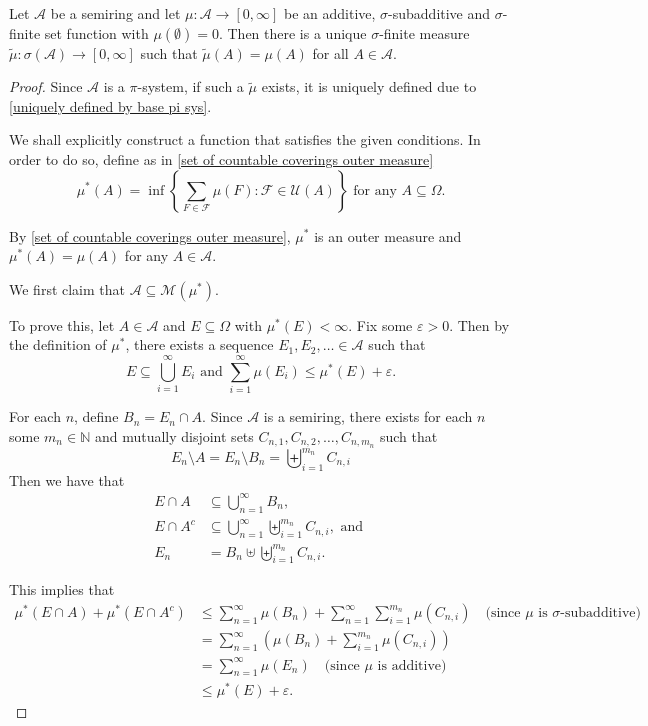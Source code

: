 \begin{theorem}
\label{MeasureExtensionTh}
    Let $\mathcal{A}$ be a semiring and let $\mu:\mathcal{A}\to[0,\infty]$ be an additive, $\sigma$-subadditive and $\sigma$-finite set function with $\mu(\emptyset)=0$. Then there is a unique $\sigma$-finite measure $\tilde\mu:\sigma(\mathcal{A})\to[0,\infty]$ such that $\tilde\mu(A)=\mu(A)$ for all $A\in\mathcal{A}$.
\end{theorem}
\begin{proof}
    Since $\mathcal{A}$ is a $\pi$-system, if such a $\tilde\mu$ exists, it is uniquely defined due to \ref{uniquely defined by base pi sys}.
    
    We shall explicitly construct a function that satisfies the given conditions. In order to do so, define as in \ref{set of countable coverings outer measure}
    $$\mu^*(A)=\inf\left\{\sum_{F\in\mathcal{F}}\mu(F) : \mathcal{F}\in\mathcal{U}(A) \right\}\text{ for any $A\subseteq\Omega$.}$$
    
    By \ref{set of countable coverings outer measure}, $\mu^*$ is an outer measure and $\mu^*(A)=\mu(A)$ for any $A\in\mathcal{A}$.
    
    \vspace{2mm}
    We first claim that $\mathcal{A}\subseteq\mathcal{M}(\mu^*)$.
    
    To prove this, let $A\in\mathcal{A}$ and $E\subseteq\Omega$ with $\mu^*(E)<\infty$. Fix some $\varepsilon>0$. Then by the definition of $\mu^*$, there exists a sequence $E_1,E_2,\ldots\in\mathcal{A}$ such that
    $$E\subseteq\bigcup_{i=1}^\infty E_i\text{ and }\sum_{i=1}^\infty \mu(E_i)\leq \mu^*(E)+\varepsilon.$$
    
    For each $n$, define $B_n=E_n\cap A$. Since $\mathcal{A}$ is a semiring, there exists for each $n$ some $m_n\in\mathbb{N}$ and mutually disjoint sets $C_{n, 1},C_{n, 2},\ldots,C_{n, m_n}$ such that
    $$E_n\setminus A = E_n\setminus B_n = \biguplus_{i=1}^{m_n}C_{n, i}$$
    Then we have that
    \begin{align*}
        E\cap A &\subseteq \bigcup_{n=1}^\infty B_n, \\
        E\cap A^c &\subseteq \bigcup_{n=1}^\infty\biguplus_{i=1}^{m_n}C_{n,i},\text{ and } \\
        E_n &= B_n\uplus\biguplus_{i=1}^{m_n}C_{n,i}.
    \end{align*}
    
    This implies that
    \begin{align*}
        \mu^*(E\cap A) + \mu^*(E\cap A^c) &\leq \sum_{n=1}^\infty\mu(B_n) + \sum_{n=1}^\infty\sum_{i=1}^{m_n}\mu(C_{n,i}) \quad\text{(since $\mu$ is $\sigma$-subadditive)} \\
        &= \sum_{n=1}^\infty\left(\mu(B_n) + \sum_{i=1}^{m_n}\mu(C_{n,i})\right) \\
        &= \sum_{n=1}^\infty \mu(E_n) \quad\text{(since $\mu$ is additive)} \\
        &   \leq \mu^*(E) + \varepsilon.
    \end{align*}
    

\end{proof}

